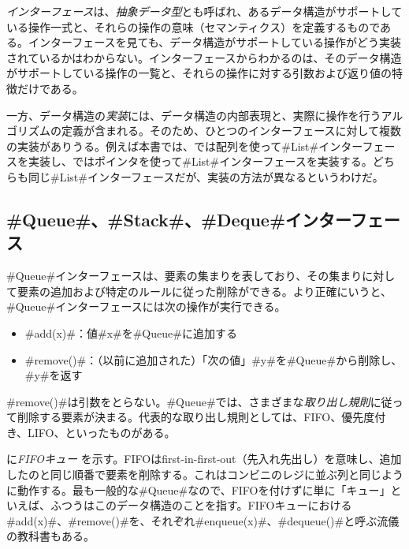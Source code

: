 \emph{インターフェース}は、\emph{抽象データ型}とも呼ばれ、あるデータ構造がサポートしている操作一式と、それらの操作の意味（セマンティクス）を定義するものである。インターフェースを見ても、データ構造がサポートしている操作がどう実装されているかはわからない。インターフェースからわかるのは、そのデータ構造がサポートしている操作の一覧と、それらの操作に対する引数および返り値の特徴だけである。 %

一方、データ構造の\emph{実装}には、データ構造の内部表現と、実際に操作を行うアルゴリズムの定義が含まれる。そのため、ひとつのインターフェースに対して複数の実装がありうる。例えば本書では、では配列を使って#List#インターフェースを実装し、ではポインタを使って#List#インターフェースを実装する。どちらも同じ#List#インターフェースだが、実装の方法が異なるというわけだ。

\subsection{#Queue#、#Stack#、#Deque#インターフェース}

#Queue#インターフェースは、要素の集まりを表しており、その集まりに対して要素の追加および特定のルールに従った削除ができる。より正確にいうと、#Queue#インターフェースには次の操作が実行できる。

\begin{itemize}
  \item #add(x)#：値#x#を#Queue#に追加する
  \item #remove()#：（以前に追加された）「次の値」#y#を#Queue#から削除し、#y#を返す
\end{itemize}

#remove()#は引数をとらない。#Queue#では、さまざまな\emph{取り出し規則}に従って削除する要素が決まる。代表的な取り出し規則としては、FIFO、優先度付き、LIFO、といったものがある。 %

に\emph{FIFOキュー} を示す。FIFOはfirst-in-first-out（先入れ先出し）を意味し、追加したのと同じ順番で要素を削除する。これはコンビニのレジに並ぶ列と同じように動作する。最も一般的な#Queue#なので、FIFOを付けずに単に「キュー」といえば、ふつうはこのデータ構造のことを指す。FIFOキューにおける#add(x)#、#remove()#を、それぞれ#enqueue(x)#、#dequeue()#と呼ぶ流儀の教科書もある。

